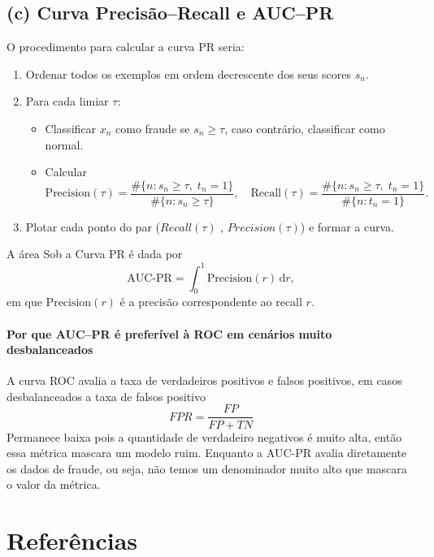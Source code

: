 \documentclass[conference]{IEEEtran}
\begin{document}
\subsection*{(c) Curva Precisão–Recall e AUC–PR}

O procedimento para calcular a curva PR seria:

\begin{enumerate}
  \item Ordenar todos os exemplos em ordem decrescente dos seus scores \(s_n\).
  \item Para cada limiar \(\tau\):
    \begin{itemize}
      \item Classificar \(x_n\) como fraude se \(s_n \ge \tau\), caso contrário, classificar como normal.
      \item Calcular
    \[
        \text{Precision}(\tau)
        = \frac{\#\{n : s_n \ge \tau,\; t_n=1\}}
               {\#\{n : s_n \ge \tau\}},
        \quad
        \text{Recall}(\tau)
        = \frac{\#\{n : s_n \ge \tau,\; t_n=1\}}
               {\#\{n : t_n=1\}}.
      \]
    \end{itemize}
  \item Plotar cada ponto do par ($Recall(\tau)$ , $Precision(\tau)$) e formar a curva.
\end{enumerate}

A área Sob a Curva PR é dada por
\[
  \mathrm{AUC\text{-}PR}
  = \int_{0}^{1} \! \text{Precision}(r)\,\mathrm{d}r,
\]
em que \(\text{Precision}(r)\) é a precisão correspondente ao recall \(r\).

\paragraph{Por que AUC–PR é preferível à ROC em cenários muito desbalanceados}
  A curva ROC avalia a taxa de verdadeiros positivos e falsos positivos, em casos desbalanceados a taxa de falsos positivo
  \[
  FPR = \frac{FP}{FP + TN}
  \]
  Permanece baixa pois a quantidade de verdadeiro negativos é muito alta, então essa métrica mascara um modelo ruim. Enquanto a AUC-PR avalia diretamente os dados de fraude, ou seja, não temos um denominador muito alto que mascara o valor da métrica. 


\section{Referências}
\label{sec:referencias}
% 
% 
\appendix
\end{document}
